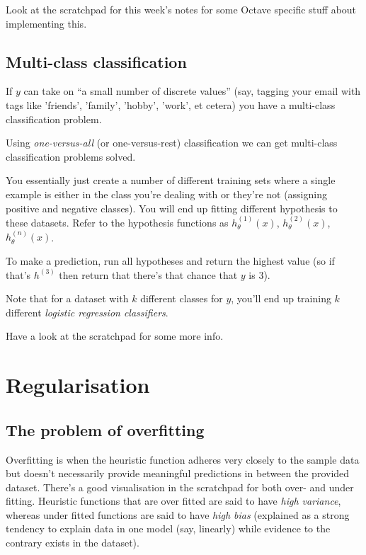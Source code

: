 Look at the scratchpad for this week's notes for some Octave specific stuff about implementing this.

\section{Multi-class classification}

If $y$ can take on ``a small number of discrete values'' (say, tagging your email with tags like 'friends', 'family', 'hobby', 'work', et cetera) you have a multi-class classification problem.

Using \emph{one-versus-all} (or one-versus-rest) classification we can get multi-class classification problems solved.

You essentially just create a number of different training sets where a single example is either in the class you're dealing with or they're not (assigning positive and negative classes). You will end up fitting different hypothesis to these datasets. Refer to the hypothesis functions as $h_\theta^{(1)}(x)$, $h_\theta^{(2)}(x)$, $h_\theta^{(n)}(x)$.

To make a prediction, run all hypotheses and return the highest value (so if that's $h^{(3)}$ then return that there's that chance that $y$ is 3).

Note that for a dataset with $k$ different classes for $y$, you'll end up training $k$ different \emph{logistic regression classifiers}.

Have a look at the scratchpad for some more info.

\chapter{Regularisation}
\section{The problem of overfitting}
Overfitting is when the heuristic function adheres very closely to the sample data but doesn't necessarily provide meaningful predictions in between the provided dataset. There's a good visualisation in the scratchpad for both over- and under fitting. Heuristic functions that are over fitted are said to have \emph{high variance}, whereas under fitted functions are said to have \emph{high bias} (explained as a strong tendency to explain data in one model (say, linearly) while evidence to the contrary exists in the dataset).

